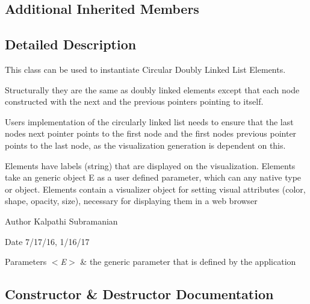 \subsection*{Additional Inherited Members}


\subsection{Detailed Description}
This class can be used to instantiate Circular Doubly Linked List Elements. 

Structurally they are the same as doubly linked elements except that each node constructed with the next and the previous pointers pointing to itself.

User\textquotesingle{}s implementation of the circularly linked list needs to ensure that the last node\textquotesingle{}s next pointer points to the first node and the first node\textquotesingle{}s previous pointer points to the last node, as the visualization generation is dependent on this.

Elements have labels (string) that are displayed on the visualization. Elements take an generic object E as a user defined parameter, which can any native type or object. Elements contain a visualizer object for setting visual attributes (color, shape, opacity, size), necessary for displaying them in a web browser

\begin{DoxyAuthor}{Author}
Kalpathi Subramanian 
\end{DoxyAuthor}
\begin{DoxyDate}{Date}
7/17/16, 1/16/17
\end{DoxyDate}

\begin{DoxyParams}{Parameters}
{\em $<$\+E$>$} & the generic parameter that is defined by the application \\
\hline
\end{DoxyParams}


\subsection{Constructor \& Destructor Documentation}
\hypertarget{classbridges_1_1base_1_1_circ_d_lelement_ad14ccb772d52c36802c118f2b3f15d59}{}
